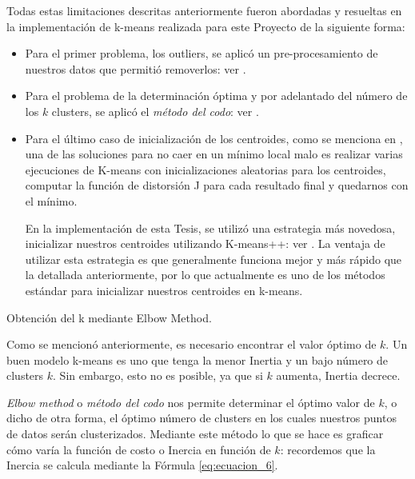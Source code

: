 \documentclass[12pt,a4paper]{article}
\makeatletter
\renewcommand\paragraph{\@startsection{paragraph}{4}{\z@}
            {-2.5ex\@plus -1ex \@minus -.25ex}
            {1.25ex \@plus .25ex}
            {\normalfont\normalsize\bfseries}}
\makeatother
\begin{document}
\begin{sloppypar}
\begin{enumerate}
\end{enumerate}

Todas estas limitaciones descritas anteriormente fueron abordadas y resueltas en la implementación de k-means realizada para este Proyecto de la siguiente forma:

\begin{itemize}

\item Para el primer problema, los outliers, se aplicó un pre-procesamiento de nuestros datos que permitió removerlos: ver \textit{}.

\item Para el problema de la determinación óptima y por adelantado del número de los $k$ clusters, se aplicó el \textit{método del codo}: ver \textit{}.

\item Para el último caso de inicialización de los centroides, como se menciona en \textit{}, una de las soluciones para no caer en un mínimo local malo es realizar varias ejecuciones de K-means con inicializaciones aleatorias para los centroides, computar la función de distorsión J para cada resultado final y quedarnos con el mínimo. 

En la implementación de esta Tesis, se utilizó una estrategia más novedosa, inicializar nuestros centroides utilizando K-means++: ver \textit{}. La ventaja de utilizar esta estrategia es que generalmente funciona mejor y más rápido que la detallada anteriormente, por lo que actualmente es uno de los métodos estándar para inicializar nuestros centroides en k-means. \cite{K_means_plus_plus}
\end{itemize}

\cleardoublepage
\paragraph{Obtención del k mediante Elbow Method.}\label{Elbow_Met}

Como se mencionó anteriormente, es necesario encontrar el valor óptimo de $k$. Un buen modelo k-means es uno que tenga la menor Inertia y un bajo número de clusters $k$. Sin embargo, esto no es posible, ya que si $k$ aumenta, Inertia decrece.

\textit{Elbow method} o \textit{método del codo} nos permite determinar el óptimo valor de $k$, o dicho de otra forma, el óptimo número de clusters en los cuales nuestros puntos de datos serán clusterizados. Mediante este método lo que se hace es graficar cómo varía la función de costo o Inercia en función de $k$: recordemos que la Inercia se calcula mediante la Fórmula \ref{eq:ecuacion_6}. 


\end{sloppypar}
\end{document}
